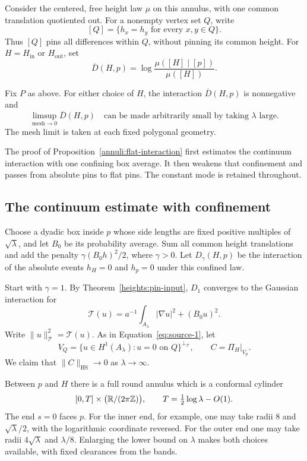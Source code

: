 Consider the centered, free height law \(\mu\) on this annulus, with
one common translation quotiented out. For a nonempty vertex set \(Q\),
write
\[
 [Q]=\{h_x=h_y\text{ for every }x,y\in Q\}.
\]
Thus \([Q]\) pins all differences within \(Q\), without pinning its
common height. For \(H=H_{\mathrm{in}}\) or \(H_{\mathrm{out}}\), set
\[
 \overline D(H,p)
   =\log\frac{\mu([H]\mid[p])}{\mu([H])}.
\]

\begin{proposition}\label{annuli:flat-interaction}
Fix \(P\) as above. For either choice of \(H\), the interaction
\(\overline D(H,p)\) is nonnegative and
\begin{equation}
 \limsup_{\mathrm{mesh}\to0}\overline D(H,p)
 \quad\text{can be made arbitrarily small by taking \(\lambda\) large.}
 \tag{7}\label{eq:source-7}
\end{equation}
The mesh limit is taken at each fixed polygonal geometry.
\end{proposition}

The proof of Proposition~\ref{annuli:flat-interaction} first estimates
the continuum interaction with one confining
box average. It then weakens that confinement and passes from absolute
pins to flat pins. The constant mode is retained throughout.

\subsection{The continuum estimate with confinement}

Choose a dyadic box inside \(p\) whose side lengths are fixed positive
multiples of \(\sqrt\lambda\), and let \(B_0\) be its probability
average. Sum all common height translations and add the penalty
\(\gamma(B_0h)^2/2\), where \(\gamma>0\). Let \(D_\gamma(H,p)\)
be the interaction of the absolute events \(h_H=0\) and \(h_p=0\)
under this confined law.

Start with \(\gamma=1\). By Theorem~\ref{heights:pin-input},
\(D_1\) converges to the Gaussian
interaction for
\[
 \mathcal T(u)=a^{-1}\int_{A_\lambda}|\nabla u|^2+(B_0u)^2.
\]
Write \(\|u\|_{\mathcal T}^2=\mathcal T(u)\).
As in Equation~\eqref{eq:source-1}, let
\[
 V_Q=\{u\in H^1(A_\lambda):u=0\text{ on }Q\}^{\perp_{\mathcal T}},
 \qquad C=\Pi_H|_{V_p}.
\]
We claim that \(\|C\|_{\mathrm{HS}}\to0\) as \(\lambda\to\infty\).

Between \(p\) and \(H\) there is a full round annulus which is a
conformal cylinder
\begin{equation}\label{annuli:cylinder}
 [0,T]\times\bigl(\mathbb R/(2\pi\mathbb Z)\bigr),\qquad
 T=\tfrac12\log\lambda-O(1).
\end{equation}
The end \(s=0\) faces \(p\). For the inner end, for example, one may
take radii \(8\) and \(\sqrt\lambda/2\), with the logarithmic coordinate
reversed. For the outer end one may take radii \(4\sqrt\lambda\) and
\(\lambda/8\). Enlarging the lower bound on \(\lambda\) makes both
choices available, with fixed clearances from the bands.

